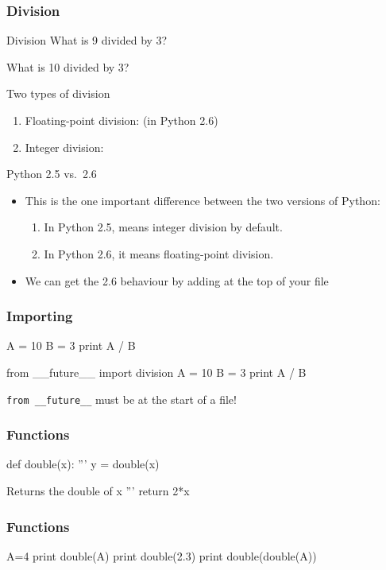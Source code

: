 \begin{frame}[fragile]
\frametitle{Division}
\begin{block}{Division}
What is 9 divided by 3?

What is 10 divided by 3?
\end{block}

\begin{block}{Two types of division}
\begin{enumerate}
\item Floating-point division:  (in Python 2.6)
\item Integer division: 
\end{enumerate}
\end{block}

\begin{block}{Python 2.5 vs.\ 2.6}
\begin{itemize}
\item This is the one important difference between the two versions of Python:
\begin{enumerate}
\item In Python 2.5,  means \alert{integer division} by default.
\item In Python 2.6, it means \alert{floating-point division}.
\end{enumerate}
\item We can get the 2.6 behaviour by adding  at the top of your file
\end{itemize}
\end{block}
\end{frame}

\begin{frame}[fragile]
\frametitle{Importing}

\begin{python}
A = 10
B = 3
print A / B
\end{python}

\begin{python}
from __future__ import division
A = 10
B = 3
print A / B
\end{python}


\lstinline{from __future__} must be at the start of a file!
\end{frame}


\begin{frame}[fragile]
\frametitle{Functions}
\begin{python}
def double(x):
    '''
    y = double(x)

    Returns the double of x
    '''
    return 2*x
\end{python}
\end{frame}

\begin{frame}[fragile]
\frametitle{Functions}
\begin{python}
A=4
print double(A)
print double(2.3)
print double(double(A))
\end{python}
\end{frame}




